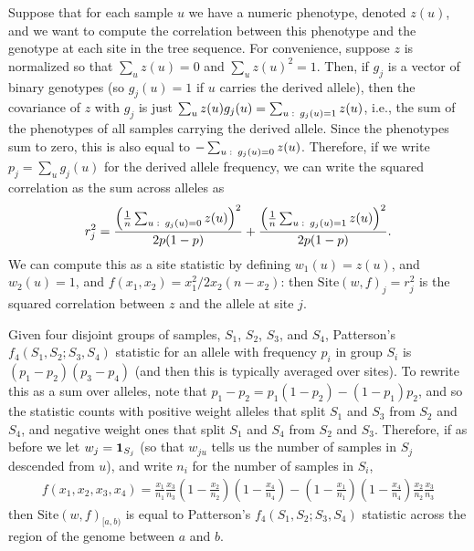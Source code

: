 \documentclass{article}
\newcommand{\site}{\mbox{Site}} %
\newcommand{\iw}{w} %
\begin{document}
\begin{example} \label{ex:site_correlations}
    Suppose that for each sample $u$ we have a numeric phenotype, denoted $z(u)$,
    and we want to compute the correlation between this phenotype
    and the genotype at each site in the tree sequence.
    For convenience, suppose $z$ is normalized so that $\sum_u z(u) = 0$ and $\sum_u z(u)^2 = 1$.
    Then, if $g_j$ is a vector of binary genotypes (so $g_j(u) = 1$ if $u$ carries the derived allele),
    then the covariance of $z$ with $g_j$ is just $\sum_u z(u) g_j(u) = \sum_{u \,\colon\, g_j(u) = 1} z(u)$,
    i.e., the sum of the phenotypes of all samples carrying the derived allele.
    Since the phenotypes sum to zero, this is also equal to
    $- \sum_{u \,\colon\, g_j(u) = 0} z(u)$.
    Therefore, if we write $p_j = \sum_u g_j(u)$ for the derived allele frequency,
    we can write the squared correlation as the sum across alleles as
    \begin{align*}
        r_j^2 =
        \frac{\left( \frac{1}{n} \sum_{u \,\colon\, g_j(u) = 0} z(u)\right)^2}{2p(1-p)}
        + \frac{\left( \frac{1}{n} \sum_{u \,\colon\, g_j(u) = 1} z(u)\right)^2}{2p(1-p)}  .
    \end{align*}
    We can compute this as a site statistic by defining $\iw_{1}(u) = z(u)$, and $\iw_{2}(u) = 1$,
    and $f(x_1, x_2) = x_1^2 / 2 x_2 (n - x_2)$:
    then $\site(\iw, f)_j = r_j^2$ is the squared correlation between $z$ and the allele at site $j$.
\end{example}

\begin{example}[Patterson's $f_4$] \label{ex:site_f4}
    Given four disjoint groups of samples, $S_1$, $S_2$, $S_3$, and $S_4$,
    Patterson's $f_4(S_1, S_2; S_3, S_4)$ statistic for an allele with frequency $p_i$ in group $S_i$
    is $(p_1 - p_2)(p_3 - p_4)$ (and then this is typically averaged over sites).
    To rewrite this as a sum over alleles, note that
    $p_1 - p_2 = p_1 (1 - p_2) - (1 - p_1) p_2$,
    and so the statistic counts with positive weight
    alleles that split $S_1$ and $S_3$ from $S_2$ and $S_4$,
    and negative weight ones that split $S_1$ and $S_4$ from $S_2$ and $S_3$.
    Therefore, if as before we
    let $\iw_j = \bone_{S_j}$
    (so that $\iw_{ju}$ tells us the number of samples in $S_j$ descended from $u$),
    and write $n_i$ for the number of samples in $S_i$,
    \begin{align*}
        f(x_1, x_2, x_3, x_4)
        =
        \frac{x_1}{n_1}
        \frac{x_3}{n_3}
        \left(1 - \frac{x_2}{n_2}\right)
        \left(1 - \frac{x_4}{n_4}\right)
        -
        \left(1 - \frac{x_1}{n_1}\right)
        \left(1 - \frac{x_4}{n_4}\right)
        \frac{x_2}{n_2}
        \frac{x_3}{n_3}
    \end{align*}
    then $\site(\iw, f)_{[a,b)}$ is equal to Patterson's $f_4(S_1, S_2; S_3, S_4)$ statistic
    across the region of the genome between $a$ and $b$.
\end{example}
\end{document}

